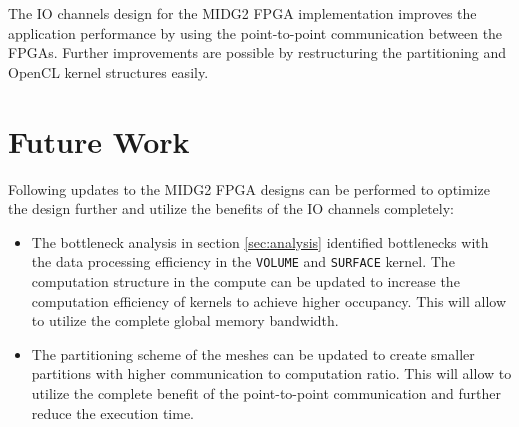The IO channels design for the MIDG2 FPGA implementation improves the application performance
by using the point-to-point communication between the FPGAs. Further improvements are
 possible by restructuring the partitioning
and OpenCL kernel structures easily.

\section{Future Work}

Following updates to the MIDG2 FPGA designs can be performed to optimize the design
further and utilize the benefits of the IO channels completely:

\begin{itemize}
    \item The bottleneck analysis in section \ref{sec:analysis} identified bottlenecks with the
    data processing efficiency in the \texttt{VOLUME} and \texttt{SURFACE} kernel. The computation structure
    in the compute can be updated to increase the computation efficiency of kernels to achieve
    higher occupancy. This will allow to utilize the complete global memory bandwidth.
    \item The partitioning scheme of the meshes can be updated to create smaller partitions with
    higher communication to computation ratio. This will allow to utilize the complete
    benefit of the point-to-point communication and further reduce the execution time.
\end{itemize}



